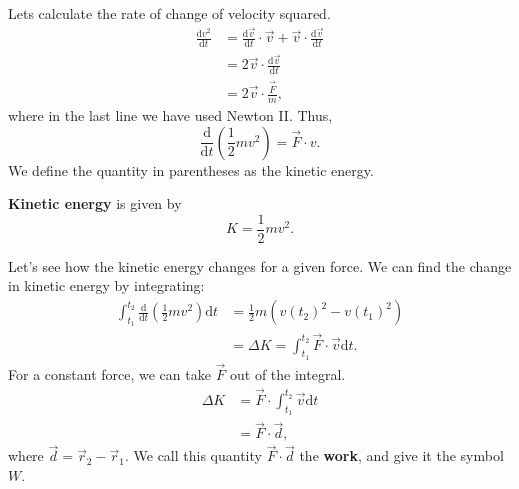 \documentclass[../newtonian_mechanics.tex]{subfiles}
\begin{document}
        \paragraph{}
        Lets calculate the rate of change of velocity squared.
        \begin{align}
            \frac{\mathrm{d}v^2}{\mathrm{d}t}&=\frac{\mathrm{d}\vec{v}}{\mathrm{d}t}\cdot\vec{v}+\vec{v}\cdot\frac{\mathrm{d}\vec{v}}{\mathrm{d}t}\\
            &=2\vec{v}\cdot\frac{\mathrm{d}\vec{v}}{\mathrm{d}t}\\
            &=2\vec{v}\cdot\frac{\vec{F}}{m},
        \end{align}
        where in the last line we have used Newton II. Thus,
        \begin{equation}
            \frac{\mathrm{d}}{\mathrm{d}t}\left(\frac{1}{2}mv^2\right)=\vec{F}\cdot{v}.
        \end{equation}
        We define the quantity in parentheses as the kinetic energy.
        \begin{definition}
            \textbf{Kinetic energy} is given by
            \begin{equation}
                K=\frac{1}{2}mv^2.
            \end{equation}
        \end{definition}
        Let's see how the kinetic energy changes for a given force. We can find the change in kinetic energy by integrating:
        \begin{align}
            \int_{t_1}^{t_2}\frac{\mathrm{d}}{\mathrm{d}t}\left(\frac{1}{2}mv^2\right)\mathrm{d}t&=\frac{1}{2}m(v(t_2)^2-v(t_1)^2)\\
            &=\Delta K=\int_{t_1}^{t_2}\vec{F}\cdot\vec{v}\mathrm{d}t.
        \end{align}
        For a constant force, we can take $\vec{F}$ out of the integral.
        \begin{align}
            \Delta K &= \vec{F}\cdot\int_{t_1}^{t_2}\vec{v}\mathrm{d}t\\
            &=\vec{F}\cdot\vec{d},
        \end{align}
        where $\vec{d}=\vec{r}_2-\vec{r}_1$.
        We call this quantity $\vec{F}\cdot\vec{d}$ the \textbf{work}, and give it the symbol $W$.
\end{document}
